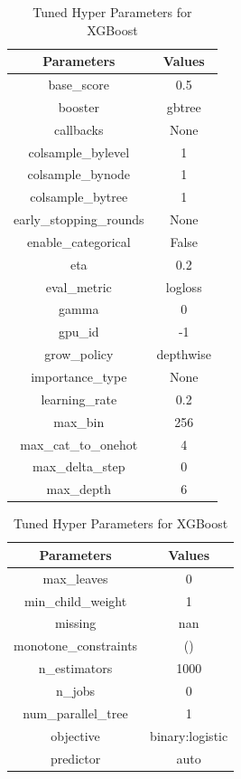 \documentclass[conference]{IEEEtran}
\begin{document}
\begin{table}[!htbp]
    \caption{Tuned Hyper Parameters for XGBoost}
    \centering
    \setlength{\tabcolsep}{1pt}
    \begin{tabular}{c c}
        \hline 
        \bfseries Parameters & \bfseries Values\\
        \hline  \hline
        base\_score & 0.5 \\
        booster & gbtree \\
        callbacks & None \\
        colsample\_bylevel & 1 \\
        colsample\_bynode & 1 \\
        colsample\_bytree & 1 \\
        early\_stopping\_rounds & None \\
        enable\_categorical & False \\
        eta & 0.2 \\
        eval\_metric & logloss \\
        gamma & 0 \\
        gpu\_id & -1 \\
        grow\_policy & depthwise \\
        importance\_type & None \\
        learning\_rate & 0.2\\
        max\_bin & 256 \\
        max\_cat\_to\_onehot & 4 \\
        max\_delta\_step & 0 \\
        max\_depth & 6 \\
        \hline
    \end{tabular}
    \quad
    \setlength{\tabcolsep}{1pt}
    \begin{tabular}{c c}
        \hline 
        \bfseries Parameters & \bfseries Values\\
        \hline  \hline
        max\_leaves & 0 \\
        min\_child\_weight & 1 \\
        missing & nan \\
        monotone\_constraints & () \\
        n\_estimators & 1000 \\
        n\_jobs & 0 \\
        num\_parallel\_tree & 1 \\
        objective & binary:logistic \\
        predictor & auto \\

\end{tabular}
\end{table}
\end{document}
